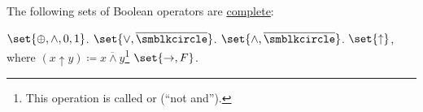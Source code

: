 \begin{proposition}\label{thm:complete_sets_of_boolean_operators}
  The following sets of Boolean operators are \hyperref[def:boolean_closure/complete]{complete}:
  \begin{thmenum}
     \( \set{ \oplus, \wedge, 0, 1 } \).
     \( \set{ \vee, \overline{\anon} } \).
     \( \set{ \wedge, \overline{\anon} } \).
     \( \set{ \uparrow } \), where \( (x \uparrow y) \coloneqq \overline{x \wedge y} \)\footnote{This operation is called  or  (\enquote{not and}).}
     \( \set{ \rightarrow, F } \).
  \end{thmenum}
\end{proposition}
